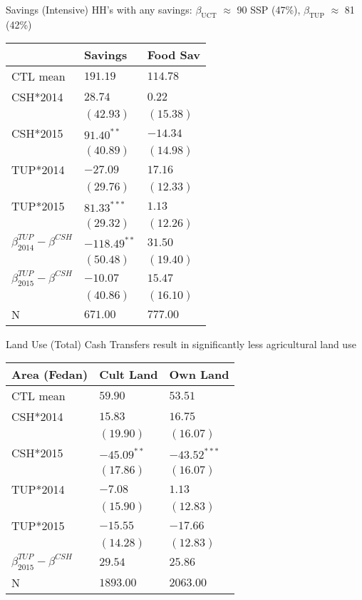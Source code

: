 \documentclass[t,presentation]{beamer}
\begin{document}
\begin{frame}[label={sec:orgheadline17}]{Savings (Intensive)}
HH's with any savings: \(\beta_{\text{UCT}}\) \(\approx\) 90 SSP (47\%), \(\beta_{\text{TUP}}\) \(\approx\) 81 (42\%)
\begin{center}
\begin{tabular}{lll}
\hline
 & Savings & Food Sav\\
\hline
CTL mean & \(191.19\) & \(114.78\)\\
\hline
CSH*2014 & \(28.74\) & \(0.22\)\\
 & \((42.93)\) & \((15.38)\)\\
CSH*2015 & \(91.40^{**}\) & \(-14.34\)\\
 & \((40.89)\) & \((14.98)\)\\
TUP*2014 & \(-27.09\) & \(17.16\)\\
 & \((29.76)\) & \((12.33)\)\\
TUP*2015 & \(81.33^{***}\) & \(1.13\)\\
 & \((29.32)\) & \((12.26)\)\\
\hline
\(\beta^{TUP}_{2014}-\beta^{CSH}\) & \(-118.49^{**}\) & \(31.50\)\\
 & \((50.48)\) & \((19.40)\)\\
\(\beta^{TUP}_{2015}-\beta^{CSH}\) & \(-10.07\) & \(15.47\)\\
 & \((40.86)\) & \((16.10)\)\\
N & \(671.00\) & \(777.00\)\\
\hline
\end{tabular}
\end{center}
\end{frame}

\begin{frame}[label={sec:orgheadline18}]{Land Use (Total)}
Cash Transfers result in significantly less agricultural land use

\begin{center}
\begin{tabular}{lll}
\hline
Area (Fedan) & Cult Land & Own Land\\
\hline
CTL mean & \(59.90\) & \(53.51\)\\
\hline
CSH*2014 & \(15.83\) & \(16.75\)\\
 & \((19.90)\) & \((16.07)\)\\
CSH*2015 & \(-45.09^{**}\) & \(-43.52^{***}\)\\
 & \((17.86)\) & \((16.07)\)\\
TUP*2014 & \(-7.08\) & \(1.13\)\\
 & \((15.90)\) & \((12.83)\)\\
TUP*2015 & \(-15.55\) & \(-17.66\)\\
 & \((14.28)\) & \((12.83)\)\\
\hline
\(\beta^{TUP}_{2015}-\beta^{CSH}\) & \(29.54\) & \(25.86\)\\
\hline
N & \(1893.00\) & \(2063.00\)\\
\hline
\end{tabular}
\end{center}
\end{frame}
\end{document}
